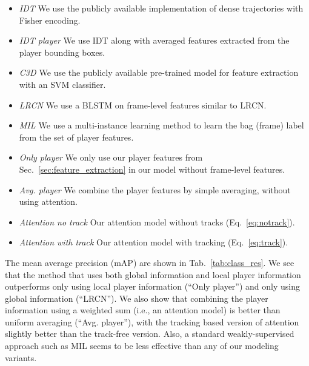 \begin{itemize}\denselist
  \item \emph{IDT\cite{Wang_CVPR11}} We use the publicly available implementation of dense trajectories with
  Fisher encoding.
  
  \item \emph{IDT\cite{Wang_CVPR11} player} We use IDT along with averaged features extracted from the player
  bounding boxes.

  \item \emph{C3D \cite{Tran_arxiv14}} We use the publicly available pre-trained model for feature extraction
  with an SVM classifier.

  \item \emph{LRCN \cite{Donahue_arxiv14}} We use a
BLSTM on frame-level features similar  to LRCN.

  \item \emph{MIL \cite{Andrews_NIPS02}} 
We use a multi-instance learning method to learn the bag (frame) label from
the set of player features.


\item \emph{Only player} We only use our player features from Sec.~\ref{sec:feature_extraction} in our model
  without frame-level features.
 
  \item \emph{Avg. player} We combine the player features by simple averaging, without
using  attention.

  \item \emph{Attention no track} Our attention model without tracks (Eq.~\ref{eq:notrack}).

  \item \emph{Attention with track} Our attention model with tracking (Eq.~\ref{eq:track}).
\end{itemize}

The mean average precision (mAP)
are shown in Tab.~\ref{tab:class_res}. We see that the method that
uses both global information and local player information outperforms
only using local player information (``Only player'')
and only using global information (``LRCN'').
We also show that combining the player
information using a weighted sum (i.e., an attention model) is better
than uniform averaging (``Avg. player''), with the tracking based version of attention
slightly better than the track-free version.
Also, a standard weakly-supervised approach such as MIL seems to be
less effective than any of our modeling variants.

